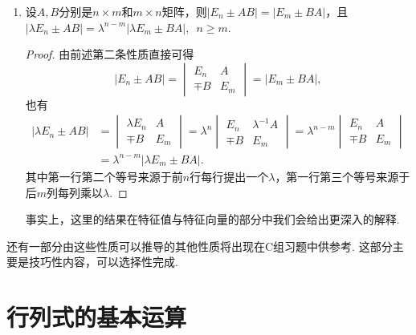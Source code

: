 \begin{enumerate}
\begin{proof}
              本条的其他结论推导类似于上方，在此不再赘述，感兴趣的读者可以自行推导，实际上结论并不是很重要，重要的是在于领悟使用行列式分块计算性质和打洞法的基本方法.
          \end{proof}

    \item 设$A,B$分别是$n \times m$和$m \times n$矩阵，则$|E_n \pm AB|=|E_m \pm BA|$，且 \\
          $|\lambda E_n \pm AB|=\lambda^{n-m}|\lambda E_m \pm BA|,\enspace n \geqslant m$.
          \begin{proof}
              由前述第二条性质直接可得
              \[|E_n \pm AB|=\begin{vmatrix}
                      E_n & A \\ \mp B & E_m
                  \end{vmatrix}=|E_m \pm BA|,\]
              也有
              \begin{align*}
                  |\lambda E_n \pm AB|
                   & =\begin{vmatrix}
                          \lambda E_n & A \\ \mp B & E_m
                      \end{vmatrix}=\lambda^n
                  \begin{vmatrix}
                      E_n & \lambda^{-1}A \\ \mp B & E_m
                  \end{vmatrix}=\lambda^{n-m}\begin{vmatrix}
                                                 E_n & A \\ \mp B & E_m
                                             \end{vmatrix} \\
                   & = \lambda^{n-m}|\lambda E_m \pm BA|.
              \end{align*}
              其中第一行第二个等号来源于前$n$行每行提出一个$\lambda$，第一行第三个等号来源于后$m$列每列乘以$\lambda$.
          \end{proof}

          事实上，这里的结果在特征值与特征向量的部分中我们会给出更深入的解释.
\end{enumerate}

还有一部分由这些性质可以推导的其他性质将出现在C组习题中供参考. 这部分主要是技巧性内容，可以选择性完成.

\section{行列式的基本运算}


